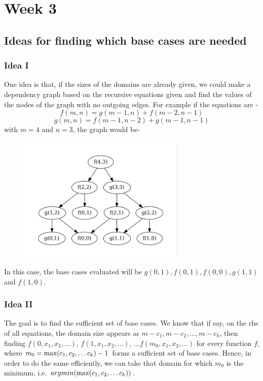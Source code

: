 \documentclass[12pt]{report}
\begin{document}
    \chapter*{Week 3}

    \section*{Ideas for finding which base cases are needed}
    \subsection*{Idea I}
    One idea is that, if the sizes of the domains are already given, we could make a dependency graph based on the recursive equations given and find the values of the nodes of the graph with no outgoing edges. For example if the equations are -
    \begin{equation*}
        f(m, n) = g(m-1, n) + f(m-2, n-1) 
    \end{equation*}
    \begin{equation*}
        g(m, n) = f(m-1, n-2) + g(m-1, n-1)
    \end{equation*}
    with $m = 4$ and $n = 3$, the graph would be- 
    \begin{figure}[h]
        \centering
        \includegraphics[width=8cm]{dep.png}
    \end{figure}
    In this case, the base cases evaluated will be $g(0,1), f(0,1), f(0, 0), g(1,1)$ and $f(1,0)$.
    \subsection*{Idea II}
    The goal is to find the sufficient set of base cases. We know that if say, on the rhs of all equations, the domain size appears as $m-c_1, m-c_2, \dots, m-c_k$, then finding $f(0, x_1, x_2, \dots)$, $f(1, x_1, x_2, \dots)$, $\dots f(m_0, x_1, x_2, \dots)$ for every function $f$, where $m_0 = \textnormal{max}(c_1, c_2, \dots c_k) - 1$ forms a sufficient set of base cases.
    Hence, in order to do the same efficiently, we can take that domain for which $m_0$ is the minimum, i.e. $argmin(\textnormal{max}(c_1, c_2, \dots c_k))$. 
\end{document}
